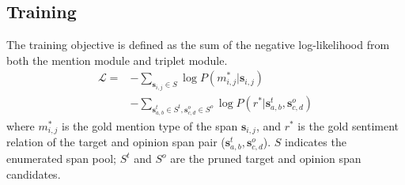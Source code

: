 \documentclass[11pt,a4paper]{article}
\begin{document}
\subsection{Training}
\label{loss}
The training objective is defined as the sum of the negative log-likelihood from both the mention module and triplet module.
\begin{equation}
\begin{split}
    \mathcal{L} =
    &- \sum_{\mathbf{s}_{i,j} \in S}\log P(m_{i,j}^* | \mathbf{s}_{i,j}) \\
    &-\sum_{\mathbf{s}_{a,b}^t \in S^t, \mathbf{s}^o_{c,d} \in S^o}\log P(r^*|\mathbf{s}_{a,b}^t, \mathbf{s}^o_{c,d})
\end{split}
\end{equation}
where $m_{i,j}^*$ is the gold mention type of the span $\mathbf{s}_{i,j}$, and $r^*$ is the gold sentiment relation of the target and opinion span pair ($\mathbf{s}_{a,b}^t, \mathbf{s}^o_{c,d}$).  $S$ indicates the enumerated span pool; $S^t$ and $S^o$ are the pruned target and opinion span candidates. 
\end{document}
